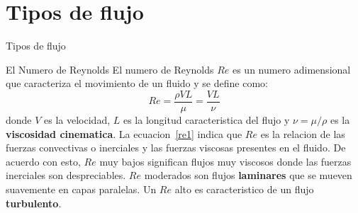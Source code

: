 \documentclass [xcolor=svgnames, t] {beamer}
\begin{document}
\section{Tipos de flujo}
\begin{frame}{Tipos de flujo}
\begin{block}{El Numero de Reynolds}
El numero de Reynolds $Re$ es un numero adimensional que caracteriza el movimiento de un fluido y se define como:
\begin{equation}
Re=\frac{\rho VL}{\mu}=\frac{VL}{\nu}
\label{re1}
\end{equation}
donde $V$ es la velocidad, $L$ es la longitud caracteristica del flujo y $\nu=\mu/\rho$  es la \textbf{viscosidad cinematica}. La ecuacion~\ref{re1} indica que $Re$ es la relacion de las fuerzas convectivas o inerciales y las fuerzas viscosas presentes en el fluido. De acuerdo con esto, $Re$ muy bajos significan flujos muy viscosos donde las fuerzas inerciales son despreciables. $Re$ moderados son flujos \textbf{laminares} que se mueven suavemente en capas paralelas. Un $Re$ alto es caracteristico de un flujo \textbf{turbulento}.  
\end{block}
\end{frame}
\end{document}
